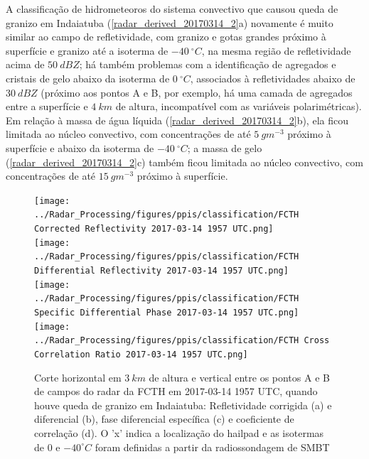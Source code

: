 A classificação de hidrometeoros do sistema convectivo que causou queda de granizo em Indaiatuba (\autoref{radar_derived_20170314_2}a) novamente é muito similar ao campo de refletividade, com granizo e gotas grandes próximo à superfície e granizo até a isoterma de $-40\:^{\circ}C$, na mesma região de refletividade acima de $50\:dBZ$; há também problemas com a identificação de agregados e cristais de gelo abaixo da isoterma de $0\:^{\circ}C$, associados à refletividades abaixo de $30\:dBZ$ (próximo aos pontos A e B, por exemplo, há uma camada de agregados entre a superfície e $4\:km$ de altura, incompatível com as variáveis polarimétricas). Em relação à massa de água líquida (\autoref{radar_derived_20170314_2}b), ela ficou limitada ao núcleo convectivo, com concentrações de até $5\:gm^{-3}$ próximo à superfície e abaixo da isoterma de $-40\:^{\circ}C$; a massa de gelo (\autoref{radar_derived_20170314_2}c) também ficou limitada ao núcleo convectivo, com concentrações de até $15\:gm^{-3}$ próximo à superfície.

\begin{figure}[hp]
	\centering
	\caption{Corte horizontal em $3\:km$ de altura e vertical entre os pontos A e B de campos do radar da FCTH em 2017-03-14 1957 UTC, quando houve queda de granizo em Indaiatuba: Refletividade corrigida (a) e diferencial (b), fase diferencial específica (c) e coeficiente de correlação (d). O 'x' indica a localização do hailpad e as isotermas de $0$ e $-40^{\circ}C$ foram definidas a partir da radiossondagem de SMBT}
	\label{radar_20170314_2}
	\vspace{-5pt}
	\texttt{[image: ../Radar\_Processing/figures/ppis/classification/FCTH Corrected Reflectivity 2017-03-14 1957 UTC.png]} \\
	\vspace{-5pt}
	\texttt{[image: ../Radar\_Processing/figures/ppis/classification/FCTH Differential Reflectivity 2017-03-14 1957 UTC.png]} \\
	\vspace{-5pt}
	\texttt{[image: ../Radar\_Processing/figures/ppis/classification/FCTH Specific Differential Phase 2017-03-14 1957 UTC.png]} \\
	\vspace{-5pt}
	\texttt{[image: ../Radar\_Processing/figures/ppis/classification/FCTH Cross Correlation Ratio 2017-03-14 1957 UTC.png]} \\
\end{figure}

